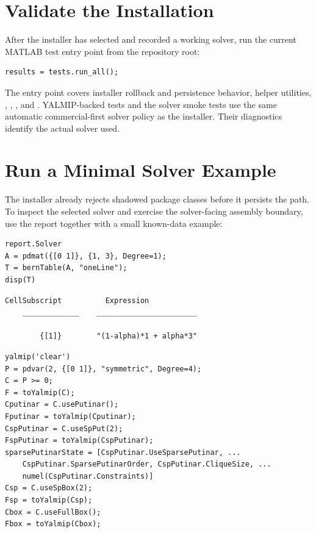 \section{Validate the Installation}
\label{sec:verification}

After the installer has selected and recorded a working solver, run the current MATLAB test entry point from the repository root:

\begin{lstlisting}[style=dpmatlab]
results = tests.run_all();
\end{lstlisting}

The entry point covers installer rollback and persistence behavior, helper utilities, , , , and . YALMIP-backed tests and the solver smoke tests use the same automatic commercial-first solver policy as the installer. Their diagnostics identify the actual solver used.

\section{Run a Minimal Solver Example}
\label{sec:quick-start}

The installer already rejects shadowed package classes before it persists the path. To inspect the selected solver and exercise the solver-facing assembly boundary, use the report together with a small known-data example:

\begin{lstlisting}[style=dpmatlab]
report.Solver
A = pdmat({[0 1]}, {1, 3}, Degree=1);
T = bernTable(A, "oneLine");
disp(T)
\end{lstlisting}

\begin{lstlisting}[style=dpoutput]
    CellSubscript          Expression
    _____________    _______________________

        {[1]}        "(1-alpha)*1 + alpha*3"
\end{lstlisting}

\begin{lstlisting}[style=dpmatlab]
yalmip('clear')
P = pdvar(2, {[0 1]}, "symmetric", Degree=4);
C = P >= 0;
F = toYalmip(C);
Cputinar = C.usePutinar();
Fputinar = toYalmip(Cputinar);
CspPutinar = C.useSpPut(2);
FspPutinar = toYalmip(CspPutinar);
sparsePutinarState = [CspPutinar.UseSparsePutinar, ...
    CspPutinar.SparsePutinarOrder, CspPutinar.CliqueSize, ...
    numel(CspPutinar.Constraints)]
Csp = C.useSpBox(2);
Fsp = toYalmip(Csp);
Cbox = C.useFullBox();
Fbox = toYalmip(Cbox);
\end{lstlisting}

